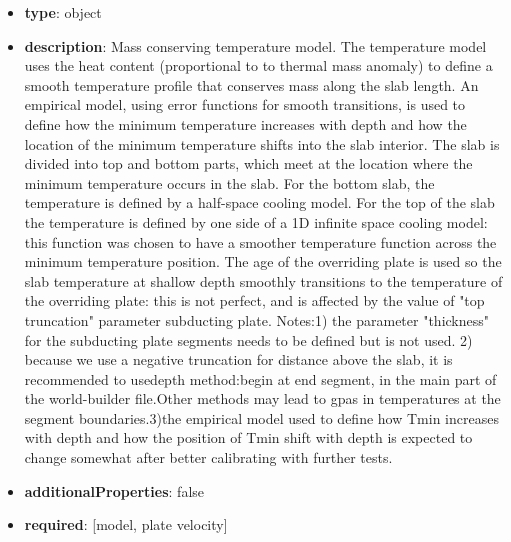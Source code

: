 \begin{itemize}[leftmargin=2em]\item {\bf type}: object
\item {\bf description}: Mass conserving temperature model. The temperature model uses the heat content (proportional to to thermal mass anomaly) to define a smooth temperature profile that conserves mass along the slab length. An empirical model, using error functions for smooth transitions, is used to  define how the minimum temperature increases with depth and how the location of the minimum temperature shifts into the slab interior. The slab is divided into top and bottom parts, which meet at the location where the minimum temperature occurs in the slab. For the bottom slab, the temperature is defined by a half-space cooling model. For the top of the slab the temperature is defined by one side of a 1D infinite space cooling model: this function was chosen to have a smoother temperature function across the minimum temperature position. The age of the overriding plate is used so the slab temperature at shallow depth smoothly transitions to the temperature of the overriding plate: this is not perfect, and is affected by the value of "top truncation" parameter subducting plate. Notes:1) the parameter "thickness" for the subducting plate segments needs to be defined but is not used. 2) because we use a negative truncation for distance above the slab, it is recommended to usedepth method:begin at end segment, in the main part of the world-builder file.Other methods may lead to gpas in temperatures at the segment boundaries.3)the empirical model used to define how Tmin increases with depth and how the position of Tmin shift with depth is expected to change somewhat after better calibrating with further tests.
\item {\bf additionalProperties}: false
\item {\bf required}: [model, plate velocity]\end{itemize}
